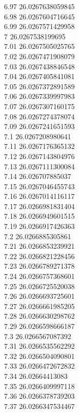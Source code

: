 {6.97	26.0267638059845\\
6.98	26.0267604716645\\
6.99	26.0267571429958\\
7	26.0267538199695\\
7.01	26.0267505025765\\
7.02	26.0267471908079\\
7.03	26.0267438846548\\
7.04	26.0267405841081\\
7.05	26.0267372891589\\
7.06	26.0267339997983\\
7.07	26.0267307160175\\
7.08	26.0267274378074\\
7.09	26.0267241651593\\
7.1	26.0267208980641\\
7.11	26.0267176365132\\
7.12	26.0267143804976\\
7.13	26.0267111300084\\
7.14	26.026707885037\\
7.15	26.0267046455743\\
7.16	26.0267014116117\\
7.17	26.0266981831404\\
7.18	26.0266949601515\\
7.19	26.0266917426363\\
7.2	26.0266885305861\\
7.21	26.0266853239921\\
7.22	26.0266821228456\\
7.23	26.0266789271378\\
7.24	26.0266757368601\\
7.25	26.0266725520038\\
7.26	26.0266693725601\\
7.27	26.0266661985205\\
7.28	26.0266630298762\\
7.29	26.0266598666187\\
7.3	26.0266567087392\\
7.31	26.0266535562292\\
7.32	26.0266504090801\\
7.33	26.0266472672832\\
7.34	26.02664413083\\
7.35	26.0266409997118\\
7.36	26.0266378739203\\
7.37	26.0266347534467\\
}
